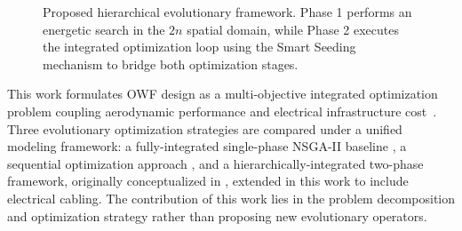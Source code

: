 \documentclass[format=sigconf,anonymous=true,review=true]{acmart}
\begin{document}
\begin{figure}[htbp]
{
  }
  \caption{Proposed hierarchical evolutionary framework. Phase 1 performs an energetic search in the $2n$ spatial domain, while Phase 2 executes the integrated optimization loop using the Smart Seeding mechanism to bridge both optimization stages.}
  \label{fig:framework_diagram}
\end{figure}

This work formulates OWF design as a multi-objective integrated optimization problem coupling aerodynamic performance and electrical infrastructure cost~\cite{Wang2019Integrated,Jin2025Integrated}. Three evolutionary optimization strategies are compared under a unified modeling framework: a fully-integrated single-phase NSGA-II baseline \cite{Deb2002NSGA2}, a sequential optimization approach \cite{Moon2015Optimal, Jin2019PowerLoss}, and a hierarchically-integrated two-phase framework, originally conceptualized in \cite{Silva2025Layout, Silva2025b}, extended in this work to include electrical cabling. The contribution of this work lies in the problem decomposition and optimization strategy rather than proposing new evolutionary operators.
\end{document}
